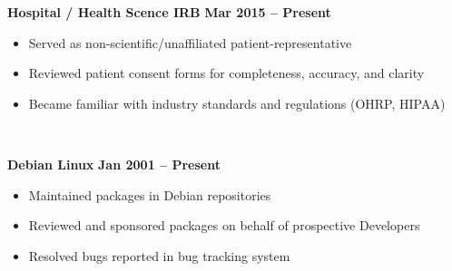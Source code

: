 \documentclass[10pt,a4paper]{article}
\newcommand{\cvproject}[4]{
    \textbf{#1} \hfill \textbf{#2} \\
    #3 \\
    #4
    \vspace{0.3em}
}
\begin{document}
    \cvproject{Hospital / Health Scence IRB}{Mar 2015 – Present}{
        \begin{itemize}
            \item Served as non-scientific/unaffiliated patient-representative
            \item Reviewed patient consent forms for completeness, accuracy, and clarity
            \item Became familiar with industry standards and regulations (OHRP, HIPAA)
        \end{itemize}
    }{}

    \cvproject{Debian Linux}{Jan 2001 – Present}{
        \begin{itemize}
            \item Maintained packages in Debian repositories
            \item Reviewed and sponsored packages on behalf of prospective Developers
            \item Resolved bugs reported in bug tracking system
        \end{itemize}
    }{}
\end{document}
